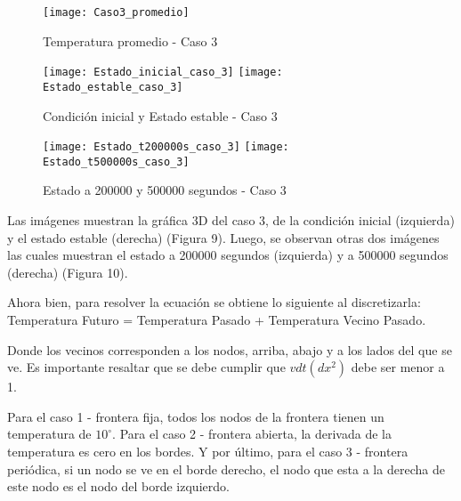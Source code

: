 \documentclass{article}
\begin{document}
\begin{figure}[h!]
\centering
\texttt{[image: Caso3\_promedio]}
\caption{Temperatura promedio - Caso 3}
\label{temp3}
\end{figure}


\begin{figure}[h!]
\centering
\texttt{[image: Estado\_inicial\_caso\_3]}
\texttt{[image: Estado\_estable\_caso\_3]}
\caption{Condición inicial y Estado estable - Caso 3}
\label{cond3}
\end{figure}

\begin{figure}[h!]
\centering
\texttt{[image: Estado\_t200000s\_caso\_3]}
\texttt{[image: Estado\_t500000s\_caso\_3]}
\caption{Estado a 200000 y 500000 segundos - Caso 3}
\label{Est3}
\end{figure}


\vspace{3mm}
Las imágenes muestran la gráfica 3D del caso 3, de la condición inicial (izquierda) y el estado estable (derecha) (Figura 9). Luego, se observan otras dos imágenes las cuales muestran el estado a 200000 segundos (izquierda) y a 500000 segundos (derecha) (Figura 10).


\newpage

\vspace{3mm}
Ahora bien, para resolver la ecuación se obtiene lo siguiente al discretizarla: Temperatura Futuro = Temperatura Pasado + Temperatura Vecino Pasado.

\vspace{2mm}
Donde los vecinos corresponden a los nodos, arriba, abajo y a los lados del que se ve. Es importante resaltar que se debe cumplir que $v dt (dx^2)$ debe ser menor a 1. 

\vspace{2mm}
Para el caso 1 - frontera fija, todos los nodos de la frontera tienen un temperatura de $10^\circ$. Para el caso 2 - frontera abierta, la derivada de la temperatura es cero en los bordes. Y por último, para el caso 3 - frontera periódica, si un nodo se ve en el borde derecho, el nodo que esta a la derecha de este nodo es el nodo del borde izquierdo. 
\end{document}
